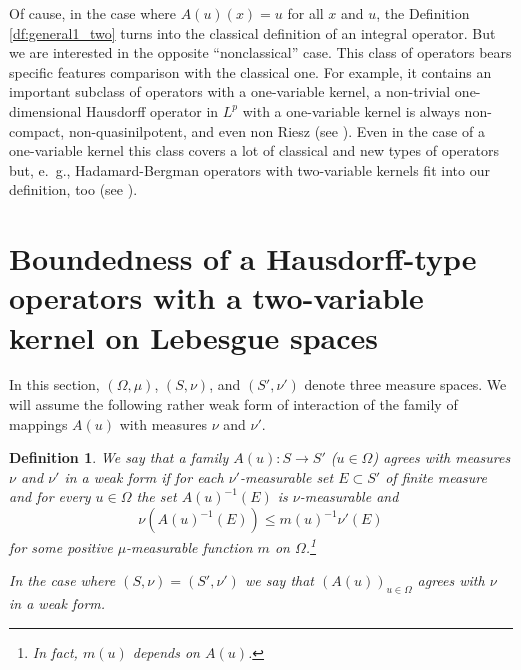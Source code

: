 \documentclass[12pt,reqno]{amsart}
\newtheorem{definition}[theorem]{Definition}
\begin{document}
Of cause, in the case where $A(u)(x)=u$ for all $x$ and $u$, the Definition \ref{df:general1_two}  turns into the classical definition of an integral operator. But we  are interested in the opposite ``nonclassical'' case. This class of operators bears specific features comparison with the classical one. For example, it contains an important  subclass of operators with a one-variable kernel,  a non-trivial one-dimensional Hausdorff operator  in $L^p$ with a one-variable kernel is always non-compact,  non-quasinilpotent, and even non Riesz (see \cite{RJMP}).  Even in the case of a one-variable kernel this   class  covers a lot of classical and new types of operators but, e.~g., Hadamard-Bergman  operators with two-variable kernels  fit into our definition, too (see \cite{KMirM, arxGeneral}).







\bigskip

\section{Boundedness  of a  Hausdorff-type operators with a two-variable kernel on Lebesgue spaces}\label{sec:Lqp_two}

\bigskip

In this section, $(\Omega,\mu)$, $(S,\nu)$,  and $(S',\nu')$ denote three  measure spaces. We will assume the following  rather weak form of interaction of the family of mappings $A(u)$ with measures $\nu$ and $\nu'$.


\begin{definition}\label{egree} %
 We say that a family $A(u): S\to S'$ ($u\in \Omega$) 
\textit{agrees with  measures $\nu$ and  $\nu'$ in a weak form}   if for each $\nu'$-measurable set $E\subset S'$ of finite measure and for every $u\in \Omega$ the set $A(u)^{-1}(E)$ is  $\nu$-measurable and
\begin{equation}\label{nuA(u)}
\nu(A(u)^{-1}(E))\le m(u)^{-1}\nu'(E)
\end{equation}
for some positive $\mu$-measurable function $m$ on $\Omega$.\footnote{In fact, $m(u)$  depends on $A(u)$.}

In the case where $(S,\nu)=(S',\nu')$ we say that $(A(u))_{u\in \Omega}$
\textit{agrees with   $\nu$  in a weak form}.
\end{definition}
\end{document}
